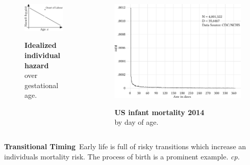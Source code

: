 \documentclass{beamer}
\begin{document}
\begin{frame}
\frametitle{\insertsection}

\begin{columns}[c]

\begin{figure}[htb!]
\caption{\textbf{Idealized individual hazard}\\over gestational age.}
\includegraphics[width = \textwidth]{./fig/birth_trauma.pdf}\\
\end{figure}

\begin{figure}[htb!]
\caption{\textbf{US infant mortality 2014}\\by day of age.}
\includegraphics[width = \textwidth]{./fig/imort_mx.pdf}\\
\end{figure}

\end{columns}

\vfill

\footnotesize\textbf{Transitional Timing}~Early life is full of risky transitions which increase an individuals mortality risk. The process of birth is a prominent example. \scriptsize\emph{cp.~\textcite{Levitis2011}}

\end{frame}
\end{document}
